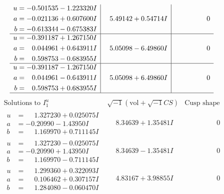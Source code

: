 \documentclass[1p]{elsarticle_modified}
\theoremstyle{definition}
\newcommand{\I}{\sqrt{-1}}
\begin{document}
$$\begin{array}{c|c|c}
\begin{aligned}
u &= -0.501535 - 1.223320 I \\
a &= -0.021136 + 0.607600 I \\
b &= -0.613344 - 0.675383 I\end{aligned}
 & \phantom{-}5.49142 + 0.54714 I & \phantom{-0.000000 } 0 \\ \hline\begin{aligned}
u &= -0.391187 + 1.267150 I \\
a &= \phantom{-}0.044961 + 0.643911 I \\
b &= \phantom{-}0.598753 - 0.683955 I\end{aligned}
 & \phantom{-}5.05098 - 6.49860 I & \phantom{-0.000000 } 0 \\ \hline\begin{aligned}
u &= -0.391187 - 1.267150 I \\
a &= \phantom{-}0.044961 - 0.643911 I \\
b &= \phantom{-}0.598753 + 0.683955 I\end{aligned}
 & \phantom{-}5.05098 + 6.49860 I & \phantom{-0.000000 } 0\\
 \hline 
 \end{array}$$\newpage$$\begin{array}{c|c|c}  
\text{Solutions to }I^u_{1}& \I (\text{vol} + \sqrt{-1}CS) & \text{Cusp shape}\\
 \hline 
\begin{aligned}
u &= \phantom{-}1.327230 + 0.025075 I \\
a &= -0.20990 - 1.43950 I \\
b &= \phantom{-}1.169970 + 0.711145 I\end{aligned}
 & \phantom{-}8.34639 + 1.35481 I & \phantom{-0.000000 } 0 \\ \hline\begin{aligned}
u &= \phantom{-}1.327230 - 0.025075 I \\
a &= -0.20990 + 1.43950 I \\
b &= \phantom{-}1.169970 - 0.711145 I\end{aligned}
 & \phantom{-}8.34639 - 1.35481 I & \phantom{-0.000000 } 0 \\ \hline\begin{aligned}
u &= \phantom{-}1.299360 + 0.322093 I \\
a &= \phantom{-}0.106462 + 0.307157 I \\
b &= \phantom{-}1.284080 - 0.060470 I\end{aligned}
 & \phantom{-}4.83167 + 3.98855 I & \phantom{-0.000000 } 0 \\ \hline\begin{aligned}

\end{aligned}
\end{array}$$
\end{document}
